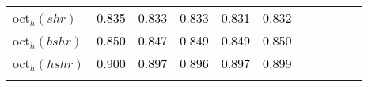\begin{tabular}[t]{l|>{}cccc>{}c|ccccc}
oct$_h(shr)$ & \textcolor{black}{0.835} & \textcolor{black}{0.833} & \textcolor{black}{0.833} & \textcolor{black}{0.831} & \textcolor{black}{0.832} &  &  &  &  & \\
oct$_h(bshr)$ & \textcolor{black}{0.850} & \textcolor{black}{0.847} & \textcolor{black}{0.849} & \textcolor{black}{0.849} & \textcolor{black}{0.850} &  &  &  &  & \\
oct$_h(hshr)$ & \textcolor{black}{0.900} & \textcolor{black}{0.897} & \textcolor{black}{0.896} & \textcolor{black}{0.897} & \textcolor{black}{0.899} &  &  &  &  & \\
\bottomrule
{}\\
\end{tabular}
